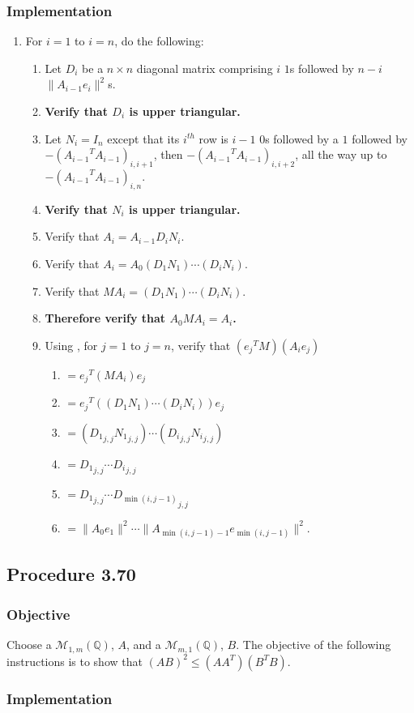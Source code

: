 \documentclass[twocolumn]{article}
\newcommand{\procedure}[2][]{\subsection*{Procedure #2 \ifthenelse{\equal{#1}{}}{}{(#1)}}\label{sec:procedure #2}}
\newcommand{\objective}{\subsubsection*{Objective}}
\newcommand{\implementation}{\subsubsection*{Implementation}}
\newcommand{\procedurehr}[2][]{\hyperref[sec:procedure #2]{\ifthenelse{\equal{#1}{}}{procedure #2}{#1}}}
\begin{document}
			\implementation
				\begin{enumerate}
					\item For $i=1$ to $i=n$, do the following:
					\begin{enumerate}
						\item Let $D_i$ be a $n\times n$ diagonal matrix comprising $i$ $1$s followed by $n-i$ $\lVert A_{i-1}e_i\rVert^2$s.
						\item \textbf{Verify that $D_i$ is upper triangular.}
						\item Let $N_i=I_n$ except that its $i^{th}$ row is $i-1$ $0$s followed by a $1$ followed by $-({A_{i-1}}^TA_{i-1})_{i,i+1}$, then $-({A_{i-1}}^TA_{i-1})_{i,i+2}$, all the way up to $-({A_{i-1}}^TA_{i-1})_{i,n}$.
						\item \textbf{Verify that $N_i$ is upper triangular.}
						\item Verify that $A_i=A_{i-1}D_iN_i$.
						\item Verify that $A_i=A_0(D_1N_1)\cdots (D_iN_i)$.
						\item Verify that $MA_i=(D_1N_1)\cdots (D_iN_i)$.
						\item \textbf{Therefore verify that $A_0MA_i=A_i$.}
						\item Using \procedurehr{3.66}, for $j=1$ to $j=n$, verify that $({e_j}^TM)(A_ie_j)$
						\begin{enumerate}
							\item $={e_j}^T(MA_i)e_j$
							\item $={e_j}^T((D_1N_1)\cdots (D_iN_i))e_j$
							\item $=({D_1}_{j,j}{N_1}_{j,j})\cdots ({D_i}_{j,j}{N_i}_{j,j})$
							\item $={D_1}_{j,j}\cdots {D_i}_{j,j}$
							\item $={D_1}_{j,j}\cdots {D_{\min(i,j-1)}}_{j,j}$
							\item $=\lVert A_0e_1\rVert^2\cdots\lVert A_{\min(i,j-1)-1}e_{\min(i,j-1)}\rVert^2$.
						\end{enumerate}
					\end{enumerate}
				\end{enumerate}
		\procedure{3.70}
			\objective
				Choose a $\mathcal{M}_{1,m}(\mathbb{Q})$, $A$, and a $\mathcal{M}_{m,1}(\mathbb{Q})$, $B$. The objective of the following instructions is to show that $(AB)^2\le(AA^T)(B^TB)$.
			\implementation
\end{document}
